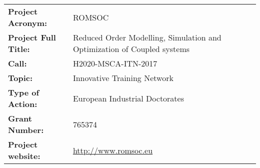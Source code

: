 \documentclass{ROMSOC}
\begin{document}
\clearpage

\setlength{\headheight}{1cm}
\setlength{\footskip}{18mm}
\addtolength{\textheight}{-\footskip}
\pagestyle{empty}

\begin{flushleft}
  \begin{tabular}{ll}
    \textbf{Project Acronym:}       &  ROMSOC \\
    \textbf{Project Full Title:}    &  Reduced Order Modelling, Simulation and Optimization of Coupled systems  \\
    \textbf{Call:}                  &  H2020-MSCA-ITN-2017 \\ 
    \textbf{Topic:}                 &  Innovative Training Network \\
    \textbf{Type of Action:}        &  European Industrial Doctorates \\
    \textbf{Grant Number:}          &   765374 \\
    \textbf{Project website:}       &  \url{http://www.romsoc.eu} 
  \end{tabular}


\newcommand\Tstrut{\rule{0pt}{2.6ex}}         %
\newcommand\Bstrut{\rule[-0.9ex]{0pt}{0pt}}   %


\end{flushleft}
\end{document}
